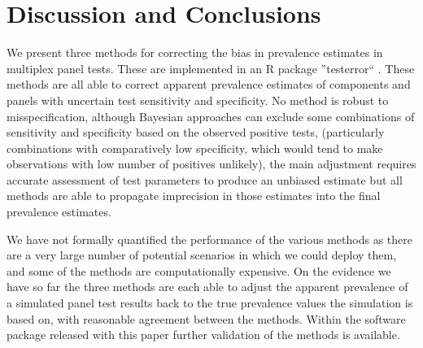 \documentclass[a4paper, 12pt, twoside]{article}
\let\Oldsection\section
\renewcommand{\section}{\FloatBarrier\Oldsection}
\begin{document}
\section{Discussion and Conclusions}

We present three methods for correcting the bias in prevalence estimates in multiplex panel tests. These are implemented in an R package ''testerror`` \cite{challen2023d}. These methods are all able to correct apparent prevalence estimates of components and panels with uncertain test sensitivity and specificity. No method is robust to misspecification, although Bayesian approaches can exclude some combinations of sensitivity and specificity based on the observed positive tests, (particularly combinations with comparatively low specificity, which would tend to make observations with low number of positives unlikely), the main adjustment requires accurate assessment of test parameters to produce an unbiased estimate but all methods are able to propagate imprecision in those estimates into the final prevalence estimates.

We have not formally quantified the performance of the various methods as there are a very large number of potential scenarios in which we could deploy them, and some of the methods are computationally expensive. On the evidence we have so far the three methods are each able to adjust the apparent prevalence of a simulated panel test results back to the true prevalence values the simulation is based on, with reasonable agreement between the methods. Within the software package released with this paper further validation of the methods is available.


\end{document}
